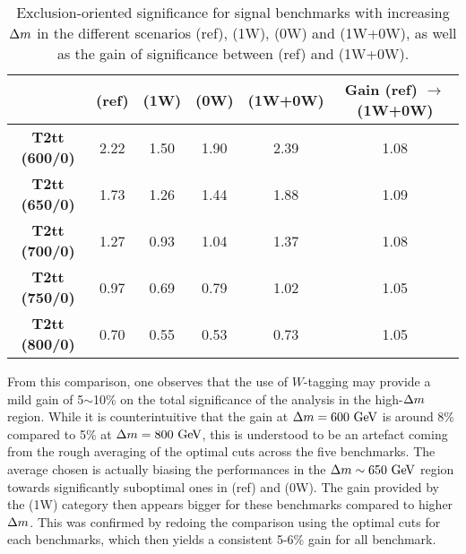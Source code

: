     \begin{table}
        \centering
        \begin{tabular}{c|c|cc|c|c}
                                   & (ref)             & (1W)                         & (0W)                   & (1W+0W) & Gain (ref) $\rightarrow$ (1W+0W)\\
            \hline
            \textbf{T2tt (600/0)}  & 2.22              & 1.50                         & 1.90                   & 2.39    & 1.08 \\
            \textbf{T2tt (650/0)}  & 1.73              & 1.26                         & 1.44                   & 1.88    & 1.09 \\
            \textbf{T2tt (700/0)}  & 1.27              & 0.93                         & 1.04                   & 1.37    & 1.08 \\
            \textbf{T2tt (750/0)}  & 0.97              & 0.69                         & 0.79                   & 1.02    & 1.05 \\
            \textbf{T2tt (800/0)}  & 0.70              & 0.55                         & 0.53                   & 0.73    & 1.05
        \end{tabular}
        \caption{Exclusion-oriented significance for signal benchmarks with increasing
        $\Delta m$ in the different scenarios (ref), (1W), (0W) and (1W+0W),
        as well as the gain of significance between (ref) and (1W+0W).}
        \label{tab:wTaggingSignificanceGain}
    \end{table}

    From this comparison, one observes that the use of $W$-tagging may provide a mild gain of
    5$\sim$10\% on the total significance of the analysis in the high-$\Delta m$ region.
    While it is counterintuitive that the gain at $\Delta m = 600~\text{GeV}$ is around 8\%
    compared to 5\% at $\Delta m = 800~\text{GeV}$, this is understood to be an artefact coming
    from the rough averaging of the optimal cuts across the five benchmarks. The average
    chosen is actually biasing the performances in the $\Delta m \sim 650~\text{GeV}$ region
    towards significantly suboptimal ones in (ref) and (0W). The gain provided by the
    (1W) category then appears bigger for these benchmarks compared to higher $\Delta m$.
    This was confirmed by redoing the comparison using the optimal cuts for
    each benchmarks, which then yields a consistent 5-6\% gain for all benchmark.

